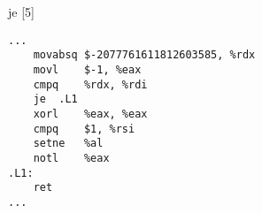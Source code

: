 \begin{figure}[H]
\begin{subfigure}[T]{0.30333333333333334\textwidth}
\begin{lrbox}{\mybox}
%
        \end{lrbox}\resizebox{\textwidth}{!}{\usebox{\mybox}}
\end{subfigure}
\begin{subfigure}[T]{0.30333333333333334\textwidth}
\caption*{}
\end{subfigure}
\begin{subfigure}[T]{0.30333333333333334\textwidth}
\caption*{}
\end{subfigure}
\hspace*{6mm}
\begin{subfigure}[T]{0.2733333333333333\textwidth}
\vspace*{2mm}\tiny je [5]
\begin{lstlisting}[style=defstyle,language={[x86masm]Assembler},basicstyle=\tiny\ttfamily,breaklines=true]
...
	movabsq	$-2077761611812603585, %rdx
	movl	$-1, %eax
	cmpq	%rdx, %rdi
	je	.L1
	xorl	%eax, %eax
	cmpq	$1, %rsi
	setne	%al
	notl	%eax
.L1:
	ret
...\end{lstlisting}
\end{subfigure}
\end{figure}
\newpage\noindent